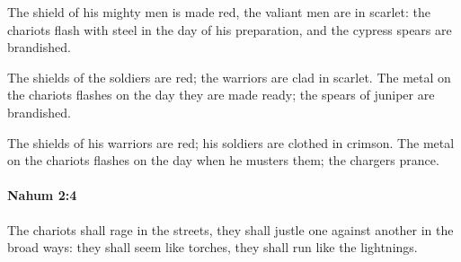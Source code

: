 			\begin{versebox}
					\item[BHS] 
					\item[LXX] 
					\item[ASV] The shield of his mighty men is made red, the valiant men are in scarlet: the chariots flash with steel in the day of his preparation, and the cypress spears are brandished.
					\item[NIV] The shields of the soldiers are red; the warriors are clad in scarlet. The metal on the chariots flashes on the day they are made ready; the spears of juniper are brandished.
					\item[NRSV] The shields of his warriors are red; his soldiers are clothed in crimson. The metal on the chariots flashes on the day when he musters them; the chargers prance.
			\end{versebox}

		\paragraph{Nahum 2:4} %
			\label{NAHUM-2-4}

			The chariots shall rage in the streets, they shall justle one against another in the broad ways: they shall seem like torches, they shall run like the lightnings.


